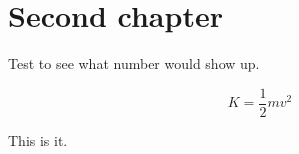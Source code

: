 \documentclass[noocg]{wwwnotes2}
\begin{document}
\lipsum[5-9]

\chapter{Second chapter}

Test \theequation to see what number would show up.

\lipsum[10-23]

\begin{equation}
K = \frac12 mv^2
\end{equation}

This is it.



\cleardoublepage
{}
{}


\end{document}
